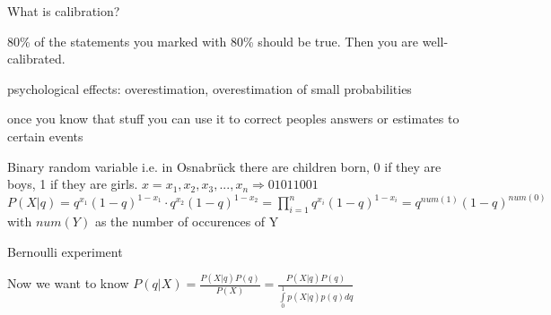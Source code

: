 What is calibration?

80\% of the statements you marked with 80\% should be true. Then you are well-calibrated.





psychological effects: overestimation, overestimation of small probabilities

once you know that stuff you can use it to correct peoples answers or estimates to certain events






Binary random variable
i.e. in Osnabrück there are children born, 0 if they are boys, 1 if they are girls.
$x=x_1,x_2,x_3,...,x_n \Rightarrow 01011001$
$P(X|q) = q^{x_1} (1-q)^{1-x_1} \cdot q^{x_2}(1-q)^{1-x_2} = \prod\limits_{i=1}^{n}{q^{x_i}(1-q)^{1-x_i}} = q^{num(1)}(1-q)^{num(0)}$ with $num(Y)$ as the number of occurences of Y

Bernoulli experiment

Now we want to know $P(q|X) = \frac{P(X|q)P(q)}{P(X)} = \frac{P(X|q)P(q)}{\int\limits_0^1 p(X|q)p(q) dq}$